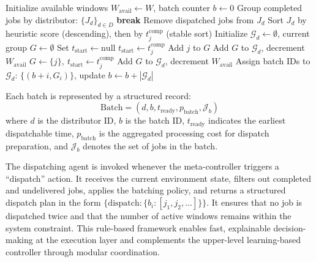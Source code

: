 \documentclass{article}
\begin{document}
\begin{algorithm}[H]
\caption{Heuristic-Based Batch Assignment}
\label{alg:dispatch_heuristic}
\begin{algorithmic}[1]
\State Initialize available windows $W_{\text{avail}} \leftarrow W$, batch counter $b \leftarrow 0$
\State Group completed jobs by distributor: $\{J_d\}_{d \in D}$
     \textbf{break} \EndIf
    \State Remove dispatched jobs from $J_d$
    \State Sort $J_d$ by heuristic score (descending), then by $t_j^{\text{comp}}$ (stable sort)
    \State Initialize $\mathcal{G}_d \leftarrow \emptyset$, current group $G \leftarrow \emptyset$
    \State Set $t_{\text{start}} \leftarrow \text{null}$
            \State $t_{\text{start}} \leftarrow t_j^{\text{comp}}$
        \EndIf
            \State Add $j$ to $G$
        \Else
                \State Add $G$ to $\mathcal{G}_d$, decrement $W_{\text{avail}}$
            \EndIf
            \State $G \leftarrow \{j\},\ t_{\text{start}} \leftarrow t_j^{\text{comp}}$
        \EndIf
    \EndFor
        \State Add $G$ to $\mathcal{G}_d$, decrement $W_{\text{avail}}$
    \EndIf
    \State Assign batch IDs to $\mathcal{G}_d$: $\{(b+i, G_i)\}$, update $b \leftarrow b + |\mathcal{G}_d|$
\EndFor
\end{algorithmic}
\end{algorithm}

Each batch is represented by a structured record:
\[
\text{Batch} = (d, b, t_{\text{ready}}, p_{\text{batch}}, \mathcal{J}_b)
\]
where $d$ is the distributor ID, $b$ is the batch ID, $t_{\text{ready}}$ indicates the earliest dispatchable time, $p_{\text{batch}}$ is the aggregated processing cost for dispatch preparation, and $\mathcal{J}_b$ denotes the set of jobs in the batch.

The dispatching agent is invoked whenever the meta-controller triggers a ``dispatch'' action. It receives the current environment state, filters out completed and undelivered jobs, applies the batching policy, and returns a structured dispatch plan in the form $\{\text{dispatch}: \{b_i: [j_1, j_2, \ldots]\}\}$. It ensures that no job is dispatched twice and that the number of active windows remains within the system constraint. This rule-based framework enables fast, explainable decision-making at the execution layer and complements the upper-level learning-based controller through modular coordination.
\end{document}
